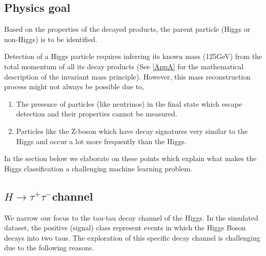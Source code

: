 \documentclass[final,3p,times,twocolumn]{elsarticle}
\begin{document}
\subsection {Physics goal} 

Based on the properties of the decayed products, the parent particle (Higgs or non-Higgs) is to be identified. \cite{RM}

Detection of a Higgs particle requires inferring its known mass (125GeV) from the total momentum of all its decay products (See \ref{AppA} for the mathematical description of the invariant mass principle). However, this mass reconstruction process might not always be possible due to, 

\begin{enumerate}
\item{The presence of particles (like neutrinos) in the final state which escape detection and their properties cannot be measured.}
\item{Particles like the Z-boson which have decay signatures very similar to the Higgs and occur a lot more frequently than the Higgs.}
\end{enumerate}
 
In the section below we elaborate on these points which explain what makes the Higgs classification a challenging machine learning problem.

\subsection{\texorpdfstring{$ H \rightarrow \tau^{+} \tau^{-} ${c}}channel}
\label{H-TT}

We narrow our focus to the tau-tau decay channel of the Higgs. In the simulated dataset, the positive (signal) class represent events in which the Higgs Boson decays into two taus. The exploration of this specific decay channel is challenging due to the following reasons. 
\end{document}
